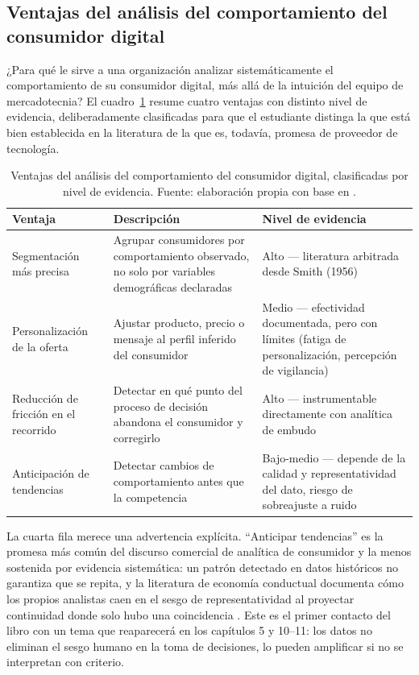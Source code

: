 \subsection{Ventajas del análisis del comportamiento del consumidor digital}

¿Para qué le sirve a una organización analizar sistemáticamente el
comportamiento de su consumidor digital, más allá de la intuición del
equipo de mercadotecnia? El cuadro~\ref{tab:cap01-ventajas} resume cuatro
ventajas con distinto nivel de evidencia, deliberadamente clasificadas para
que el estudiante distinga la que está bien establecida en la literatura de
la que es, todavía, promesa de proveedor de tecnología.

\begin{table}[htbp]
\centering
\begin{tabular}{@{}p{3.2cm}p{6.3cm}p{3.5cm}@{}}
\toprule
Ventaja & Descripción & Nivel de evidencia \\
\midrule
Segmentación más precisa & Agrupar consumidores por comportamiento observado, no solo por variables demográficas declaradas & Alto — literatura arbitrada desde Smith (1956) \\
Personalización de la oferta & Ajustar producto, precio o mensaje al perfil inferido del consumidor & Medio — efectividad documentada, pero con límites (fatiga de personalización, percepción de vigilancia) \\
Reducción de fricción en el recorrido & Detectar en qué punto del proceso de decisión abandona el consumidor y corregirlo & Alto — instrumentable directamente con analítica de embudo \\
Anticipación de tendencias & Detectar cambios de comportamiento antes que la competencia & Bajo-medio — depende de la calidad y representatividad del dato, riesgo de sobreajuste a ruido \\
\bottomrule
\end{tabular}
\caption{Ventajas del análisis del comportamiento del consumidor digital,
clasificadas por nivel de evidencia. Fuente: elaboración propia con base en
\parencite{smith1956,solomon2017,sheth2026}.}
\label{tab:cap01-ventajas}
\end{table}

La cuarta fila merece una advertencia explícita. \enquote{Anticipar tendencias} es la
promesa más común del discurso comercial de analítica de consumidor y la
menos sostenida por evidencia sistemática: un patrón detectado en datos
históricos no garantiza que se repita, y la literatura de economía
conductual documenta cómo los propios analistas caen en el sesgo de
representatividad al proyectar continuidad donde solo hubo una coincidencia
\parencite{tverskykahneman1974}. Este es el primer contacto del libro con un
tema que reaparecerá en los capítulos 5 y 10--11: los datos no eliminan el
sesgo humano en la toma de decisiones, lo pueden amplificar si no se
interpretan con criterio.

